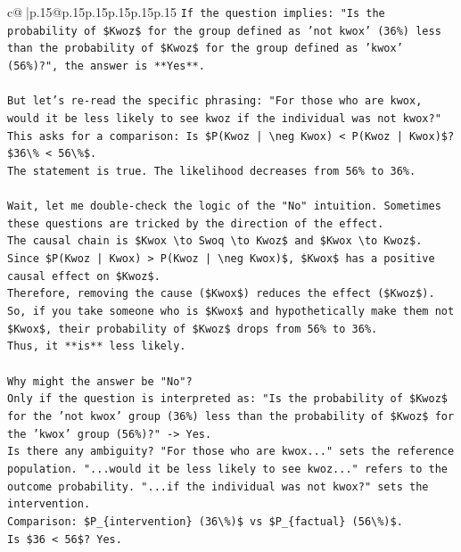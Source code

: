 \documentclass{article}
\begin{document}
{\begin{supertabular}{c@{$\;$}|p{.15\linewidth}@{}p{.15\linewidth}p{.15\linewidth}p{.15\linewidth}p{.15\linewidth}p{.15\linewidth}}
{{{\texttt{If the question implies: "Is the probability of \$Kwoz\$ for the group defined as 'not kwox' (36\%) less than the probability of \$Kwoz\$ for the group defined as 'kwox' (56\%)?", the answer is **Yes**.} \\
\\ 
\texttt{But let's re{-}read the specific phrasing: "For those who are kwox, would it be less likely to see kwoz if the individual was not kwox?"} \\
\texttt{This asks for a comparison: Is \$P(Kwoz | \textbackslash{}neg Kwox) < P(Kwoz | Kwox)\$?} \\
\texttt{\$36\textbackslash{}\% < 56\textbackslash{}\%\$.} \\
\texttt{The statement is true. The likelihood decreases from 56\% to 36\%.} \\
\\ 
\texttt{Wait, let me double{-}check the logic of the "No" intuition. Sometimes these questions are tricked by the direction of the effect.} \\
\texttt{The causal chain is \$Kwox \textbackslash{}to Swoq \textbackslash{}to Kwoz\$ and \$Kwox \textbackslash{}to Kwoz\$.} \\
\texttt{Since \$P(Kwoz | Kwox) > P(Kwoz | \textbackslash{}neg Kwox)\$, \$Kwox\$ has a positive causal effect on \$Kwoz\$.} \\
\texttt{Therefore, removing the cause (\$Kwox\$) reduces the effect (\$Kwoz\$).} \\
\texttt{So, if you take someone who is \$Kwox\$ and hypothetically make them not \$Kwox\$, their probability of \$Kwoz\$ drops from 56\% to 36\%.} \\
\texttt{Thus, it **is** less likely.} \\
\\ 
\texttt{Why might the answer be "No"?} \\
\texttt{Only if the question is interpreted as: "Is the probability of \$Kwoz\$ for the 'not kwox' group (36\%) less than the probability of \$Kwoz\$ for the 'kwox' group (56\%)?" {-}> Yes.} \\
\texttt{Is there any ambiguity? "For those who are kwox..." sets the reference population. "...would it be less likely to see kwoz..." refers to the outcome probability. "...if the individual was not kwox?" sets the intervention.} \\
\texttt{Comparison: \$P\_\{intervention\} (36\textbackslash{}\%)\$ vs \$P\_\{factual\} (56\textbackslash{}\%)\$.} \\
\texttt{Is \$36 < 56\$? Yes.} \\
}}}
\end{supertabular}}
\end{document}
